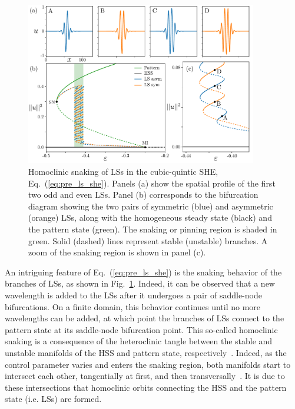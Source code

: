 \begin{figure}[h]
    \centering
    \includegraphics[width=0.9\textwidth]{imagenes/framework/LS/she_full_snaking.pdf}
    \caption{Homoclinic snaking of LSs in the cubic-quintic SHE, Eq.~(\ref{eq:pre_ls_she}).
    Panels (a) show the spatial profile of the first two odd and even LSs.
    Panel (b) corresponds to the bifurcation diagram showing the two pairs of symmetric 
    (blue) and asymmetric (orange) LSs, along with the homogeneous steady 
    state (black) and the pattern state (green). The snaking or pinning region is shaded in green. 
    Solid (dashed) lines represent stable (unstable) branches. A zoom of 
    the snaking region is shown in panel (c).}
    \label{fig:pre_ls_she_bif}
\end{figure}

An intriguing feature of Eq.~(\ref{eq:pre_ls_she}) is the snaking behavior of the branches of LSs, as shown
in Fig.~\ref{fig:pre_ls_she_bif}. Indeed, it can be observed that a new wavelength 
is added to the LSs after it undergoes a pair of saddle-node bifurcations. On a finite
domain, this behavior continues until no more wavelengths can be added, at which point the branches
of LSs connect to the pattern state at its saddle-node bifurcation point.
This so-called homoclinic snaking is a consequence of the heteroclinic tangle
between the stable and unstable manifolds of the HSS and pattern state, 
respectively~\cite{woods1999heteroclinic,coullet2000stable}. Indeed, as the
control parameter varies and enters the snaking region, both manifolds start
to intersect each other, tangentially at first, and then transversally~\cite{knobloch2015spatial}. 
It is due
to these intersections that homoclinic orbits connecting the HSS and the pattern state
(i.e. LSs) are formed.

